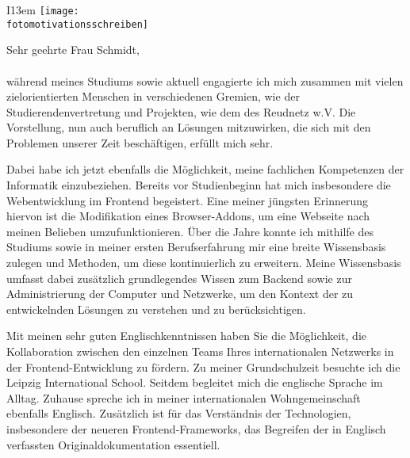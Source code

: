 \begin{letter}{}%
	\opening{}
	\begin{wrapfigure}[14]{I}{13em}
		\texttt{[image: \\fotomotivationsschreiben]}%
	\end{wrapfigure}

	Sehr geehrte Frau Schmidt,\\\\
	während meines Studiums sowie aktuell engagierte ich mich zusammen mit vielen zielorientierten Menschen in verschiedenen Gremien, wie der Studierendenvertretung und Projekten, wie dem des Reudnetz w.V. %
	Die Vorstellung, nun auch beruflich an Lösungen mitzuwirken, die sich mit den Problemen unserer Zeit beschäftigen, erfüllt mich sehr.
	
	Dabei habe ich jetzt ebenfalls die Möglichkeit, meine fachlichen Kompetenzen der Informatik einzubeziehen. Bereits vor Studienbeginn hat mich insbesondere die Webentwicklung im Frontend begeistert. Eine meiner jüngsten Erinnerung hiervon ist die Modifikation eines Browser-Addons, um eine Webseite nach meinen Belieben umzufunktionieren. Über die Jahre konnte ich mithilfe des Studiums sowie in meiner ersten Berufserfahrung mir eine breite Wissensbasis zulegen und Methoden, um diese kontinuierlich zu erweitern. Meine Wissensbasis umfasst dabei zusätzlich grundlegendes Wissen zum Backend sowie zur Administrierung der Computer und Netzwerke, um den Kontext der zu entwickelnden Lösungen zu verstehen und zu berücksichtigen.
		
	Mit meinen sehr guten Englischkenntnissen haben Sie die Möglichkeit, die Kollaboration zwischen den einzelnen Teams Ihres internationalen Netzwerks in der Frontend-Entwicklung zu fördern. Zu meiner Grundschulzeit besuchte ich die Leipzig International School. Seitdem begleitet mich die englische Sprache im Alltag. Zuhause spreche ich in meiner internationalen Wohngemeinschaft ebenfalls Englisch. Zusätzlich ist für das Verständnis der Technologien, insbesondere der neueren Frontend-Frameworks, das Begreifen der in Englisch verfassten Originaldokumentation essentiell.
	

\end{letter}
